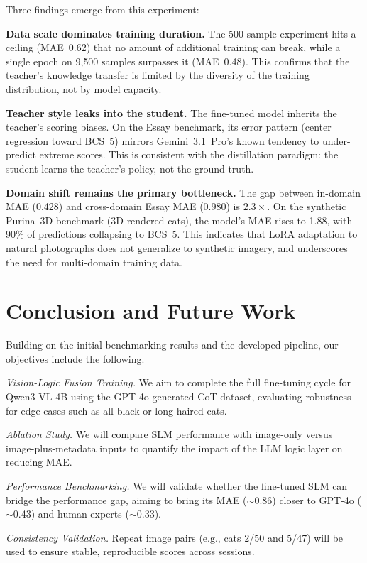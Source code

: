 \documentclass[11pt,twocolumn]{article}
\begin{document}
Three findings emerge from this experiment:

\textbf{Data scale dominates training duration.} The 500-sample experiment hits a ceiling (MAE~0.62) that no amount of additional training can break, while a single epoch on 9{,}500 samples surpasses it (MAE~0.48). This confirms that the teacher's knowledge transfer is limited by the diversity of the training distribution, not by model capacity.

\textbf{Teacher style leaks into the student.} The fine-tuned model inherits the teacher's scoring biases. On the Essay benchmark, its error pattern (center regression toward BCS~5) mirrors Gemini~3.1~Pro's known tendency to under-predict extreme scores. This is consistent with the distillation paradigm: the student learns the teacher's policy, not the ground truth.

\textbf{Domain shift remains the primary bottleneck.} The gap between in-domain MAE (0.428) and cross-domain Essay MAE (0.980) is $2.3\times$. On the synthetic Purina~3D benchmark (3D-rendered cats), the model's MAE rises to 1.88, with 90\% of predictions collapsing to BCS~5. This indicates that LoRA adaptation to natural photographs does not generalize to synthetic imagery, and underscores the need for multi-domain training data.

\section{Conclusion and Future Work}

Building on the initial benchmarking results and the developed pipeline, our objectives include the following.

\textit{Vision-Logic Fusion Training.} We aim to complete the full fine-tuning cycle for Qwen3-VL-4B using the GPT-4o-generated CoT dataset, evaluating robustness for edge cases such as all-black or long-haired cats.

\textit{Ablation Study.} We will compare SLM performance with image-only versus image-plus-metadata inputs to quantify the impact of the LLM logic layer on reducing MAE.

\textit{Performance Benchmarking.} We will validate whether the fine-tuned SLM can bridge the performance gap, aiming to bring its MAE ($\sim$0.86) closer to GPT-4o ($\sim$0.43) and human experts ($\sim$0.33).

\textit{Consistency Validation.} Repeat image pairs (e.g., cats 2/50 and 5/47) will be used to ensure stable, reproducible scores across sessions.
\end{document}
